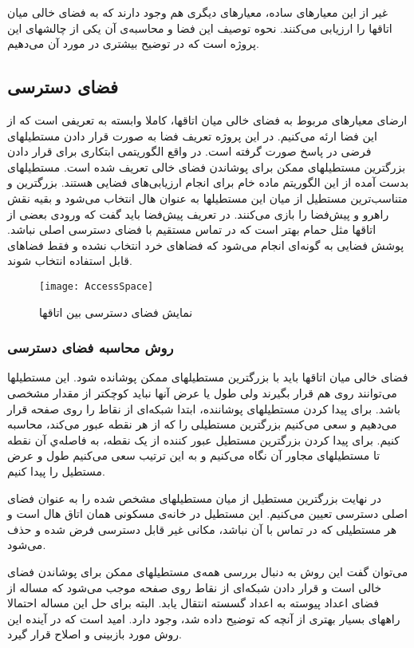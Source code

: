 \documentclass{report}
\begin{document}
غیر از این معیارهای ساده، معیارهای دیگری هم وجود دارند که به فضای خالی میان اتاقها را ارزیابی می‌کنند. نحوه توصیف این فضا و محاسبه‌ی آن یکی از چالشهای این پروژه است که در توضیح بیشتری در مورد آن می‌دهیم.

\subsection{فضای دسترسی}
ارضای معیارهای مربوط به فضای خالی میان اتاقها، کاملا وابسته به تعریفی است که از این فضا ارئه می‌کنیم. در این پروژه تعریف فضا به صورت قرار دادن مستطیلهای فرضی در پاسخ صورت گرفته است. در واقع الگوریتمی ابتکاری برای قرار دادن بزرگترین مستطیلهای ممکن برای پوشاندن فضای خالی تعریف شده است. مستطیلهای بدست آمده از این الگوریتم ماده خام برای انجام ارزیابی‌های فضایی هستند. بزرگترین و متناسب‌ترین مستطیل از میان این مستطیلها به عنوان هال انتخاب می‌شود و بقیه نقش راهرو و پیش‌فضا را بازی می‌کنند. در تعریف پیش‌فضا باید گفت که ورودی بعضی از اتاقها مثل حمام بهتر است که در تماس مستقیم با فضای دسترسی اصلی نباشد. پوشش فضایی به گونه‌ای انجام می‌شود که فضاهای خرد انتخاب نشده و فقط فضاهای قابل استفاده انتخاب شوند.

\begin{figure} \centerline{\texttt{[image: AccessSpace]}} \caption{\label{fAccessSpace}
 نمایش فضای دسترسی بین اتاقها
 } \end{figure}

\subsubsection{روش محاسبه فضای دسترسی}
فضای خالی میان اتاقها باید با بزرگترین مستطیلهای ممکن پوشانده شود. این مستطیلها می‌توانند روی هم قرار بگیرند ولی طول یا عرض آنها نباید کوچکتر از مقدار مشخصی باشد. برای پیدا کردن مستطیلهای پوشاننده، ابتدا شبکه‌ای از نقاط را روی صفحه قرار می‌دهیم و سعی می‌کنیم بزرگترین مستطیلی را که از هر نقطه عبور می‌کند، محاسبه کنیم. برای پیدا کردن بزرگترین مستطیل عبور کننده از یک نقطه، به فاصله‌ي آن نقطه تا مستطیلهای مجاور آن نگاه می‌کنیم و به این ترتیب سعی می‌کنیم طول و عرض مستطیل را پیدا کنیم.

در نهایت بزرگترین مستطیل از میان مستطیلهای مشخص شده را به عنوان فضای اصلی دسترسی تعیین می‌کنیم. این مستطیل در خانه‌ی مسکونی همان اتاق هال است و هر مستطیلی که در تماس با آن نباشد، مکانی غیر قابل دسترسی فرض شده و حذف می‌شود.

می‌توان گفت این روش به دنبال بررسی همه‌ی مستطیلهای ممکن برای پوشاندن فضای خالی است و قرار دادن شبکه‌ای از نقاط روی صفحه موجب می‌شود که مساله از فضای اعداد پیوسته به اعداد گسسته انتقال یابد. البته برای حل این مساله احتمالا راههای بسیار بهتری از آنچه که توضیح داده شد، وجود دارد. امید است که در آینده این روش مورد بازبینی و اصلاح قرار گیرد.
\end{document}
